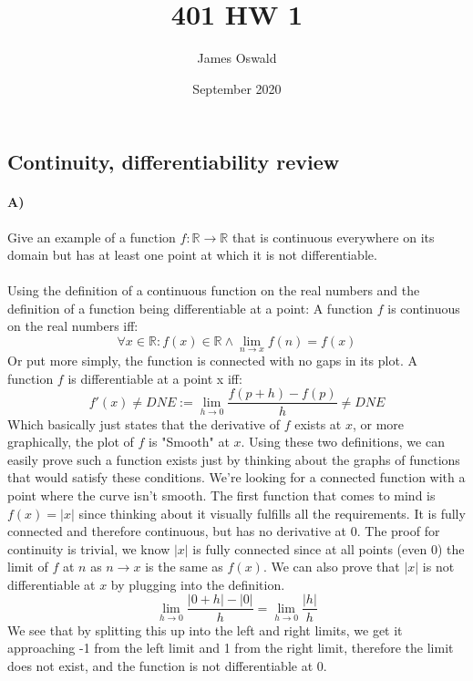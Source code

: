 \documentclass{article}
\title{401 HW 1}
\author{James Oswald}
\date{September 2020}
\begin{document}
\maketitle
\addtocounter{section}{2}

\subsection{Continuity, differentiability review}
\paragraph{A)}
Give an example of a function $f:\mathbb{R}\to\mathbb{R}$ that is continuous everywhere on its domain but has at least one point at which it is not differentiable.
\paragraph{}
Using the definition of a continuous function on the real numbers and the definition of a function being differentiable at a point:
\newline\newline
A function $f$ is continuous on the real numbers iff:
\[\forall x\in\mathbb{R}:f(x)\in\mathbb{R}\wedge\lim_{n\to x}f(n) = f(x)\]
Or put more simply, the function is connected with no gaps in its plot. A function $f$ is differentiable at a point x iff:
\[f'(x)\neq DNE := \lim_{h\to 0}\frac{f(p+h) - f(p)}{h}\neq DNE\]
Which basically just states that the derivative of $f$ exists at $x$, or more graphically, the plot of $f$ is "Smooth" at $x$. Using these two definitions, we can easily prove such a function exists just by thinking about the graphs of functions that would satisfy these conditions. We're looking for a connected function with a point where the curve isn't smooth. The first function that comes to mind is $f(x) = |x|$ since thinking about it visually fulfills all the requirements. It is fully connected and therefore continuous, but has no derivative at 0. The proof for continuity is trivial, we know $|x|$ is fully connected since at all points (even 0) the limit of $f$ at $n$  as $n \to x$ is the same as $f(x)$. We can also prove that $|x|$ is not differentiable at $x$ by plugging into the definition. 
\[\lim_{h\to 0}\frac{|0+h| - |0|}{h} = \lim_{h\to 0}\frac{|h|}{h}\]
We see that by splitting this up into the left and right limits, we get it approaching -1 from the left limit and 1 from the right limit, therefore the limit does not exist, and the function is not differentiable at 0.
\newpage
\end{document}
